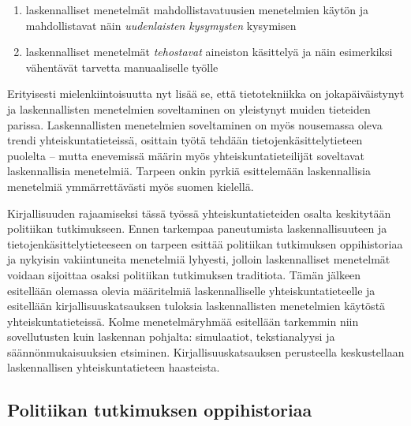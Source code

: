 \documentclass[finnish,gradu,twoside,12pt]{tktltiki}
\begin{document}
\begin{enumerate}
\item laskennalliset menetelmät mahdollistavatuusien menetelmien käytön ja mahdollistavat näin  \textit{uudenlaisten kysymysten} kysymisen
\item laskennalliset menetelmät \textit{tehostavat} aineiston käsittelyä ja näin esimerkiksi vähentävät tarvetta manuaaliselle työlle
\end{enumerate}

Erityisesti mielenkiintoisuutta nyt lisää se, että tietotekniikka on jokapäiväistynyt ja laskennallisten menetelmien soveltaminen on yleistynyt muiden tieteiden parissa. Laskennallisten menetelmien soveltaminen on myös nousemassa oleva trendi yhteiskuntatieteissä, osittain työtä tehdään tietojenkäsittelytieteen puolelta -- mutta enevemissä määrin myös yhteiskuntatieteilijät soveltavat laskennallisia menetelmiä. Tarpeen onkin pyrkiä esittelemään laskennallisia menetelmiä ymmärrettävästi myös suomen kielellä.

Kirjallisuuden rajaamiseksi tässä työssä yhteiskuntatieteiden osalta keskitytään politiikan tutkimukseen. Ennen tarkempaa paneutumista laskennallisuuteen ja tietojenkäsittelytieteeseen on tarpeen esittää politiikan tutkimuksen oppihistoriaa ja nykyisin vakiintuneita menetelmiä lyhyesti, jolloin laskennalliset menetelmät voidaan sijoittaa osaksi politiikan tutkimuksen traditiota. Tämän jälkeen esitellään olemassa olevia määritelmiä laskennalliselle yhteiskuntatieteelle ja esitellään kirjallisuuskatsauksen tuloksia laskennallisten menetelmien käytöstä yhteiskuntatieteissä. Kolme menetelmäryhmää esitellään tarkemmin niin sovellutusten kuin laskennan pohjalta: simulaatiot, tekstianalyysi ja säännönmukaisuuksien etsiminen. Kirjallisuuskatsauksen perusteella keskustellaan laskennallisen yhteiskuntatieteen haasteista.


\subsection{Politiikan tutkimuksen oppihistoriaa}
\end{document}
